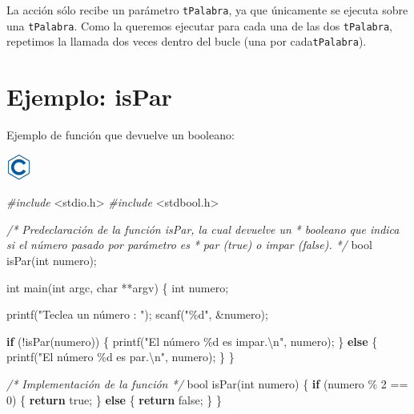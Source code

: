 \documentclass[
]{book}
\newenvironment{Shaded}{\begin{snugshade}}{\end{snugshade}}
\newcommand{\CommentTok}[1]{\textcolor[rgb]{0.56,0.35,0.01}{\textit{#1}}}
\newcommand{\ControlFlowTok}[1]{\textcolor[rgb]{0.13,0.29,0.53}{\textbf{#1}}}
\newcommand{\DataTypeTok}[1]{\textcolor[rgb]{0.13,0.29,0.53}{#1}}
\newcommand{\DecValTok}[1]{\textcolor[rgb]{0.00,0.00,0.81}{#1}}
\newcommand{\ImportTok}[1]{#1}
\newcommand{\NormalTok}[1]{#1}
\newcommand{\PreprocessorTok}[1]{\textcolor[rgb]{0.56,0.35,0.01}{\textit{#1}}}
\newcommand{\SpecialCharTok}[1]{\textcolor[rgb]{0.00,0.00,0.00}{#1}}
\newcommand{\StringTok}[1]{\textcolor[rgb]{0.31,0.60,0.02}{#1}}
\begin{document}
La acción sólo recibe un parámetro \texttt{tPalabra}, ya que únicamente se ejecuta sobre una \texttt{tPalabra}. Como la queremos ejecutar para cada una de las dos \texttt{tPalabra}, repetimos la llamada dos veces dentro del bucle (una por cada\texttt{tPalabra}).

\hypertarget{ejemplo-ispar}{%
\section{Ejemplo: isPar}\label{ejemplo-ispar}}

Ejemplo de función que devuelve un booleano:

\includegraphics{./img/c.png}

\begin{Shaded}
\begin{Highlighting}[]
\PreprocessorTok{\#include }\ImportTok{\textless{}stdio.h\textgreater{}}
\PreprocessorTok{\#include }\ImportTok{\textless{}stdbool.h\textgreater{}}

\CommentTok{/* Predeclaración de la función isPar, la cual devuelve un}
\CommentTok{ * booleano que indica si el número pasado por parámetro es}
\CommentTok{ * par (true) o impar (false).}
\CommentTok{ */}
\DataTypeTok{bool}\NormalTok{ isPar(}\DataTypeTok{int}\NormalTok{ numero);}

\DataTypeTok{int}\NormalTok{ main(}\DataTypeTok{int}\NormalTok{ argc, }\DataTypeTok{char}\NormalTok{ **argv) \{}
    \DataTypeTok{int}\NormalTok{ numero;}
    
\NormalTok{    printf(}\StringTok{"Teclea un número : "}\NormalTok{);}
\NormalTok{    scanf(}\StringTok{"\%d"}\NormalTok{, \&numero);}

    \ControlFlowTok{if}\NormalTok{ (!isPar(numero)) \{}
\NormalTok{        printf(}\StringTok{"El número \%d es impar.}\SpecialCharTok{\textbackslash{}n}\StringTok{"}\NormalTok{, numero);}
\NormalTok{    \} }\ControlFlowTok{else}\NormalTok{ \{}
\NormalTok{        printf(}\StringTok{"El número \%d es par.}\SpecialCharTok{\textbackslash{}n}\StringTok{"}\NormalTok{, numero);}
\NormalTok{    \}}
\NormalTok{\}}

\CommentTok{/* Implementación de la función */}
\DataTypeTok{bool}\NormalTok{ isPar(}\DataTypeTok{int}\NormalTok{ numero) \{}
    \ControlFlowTok{if}\NormalTok{ (numero \% }\DecValTok{2}\NormalTok{ == }\DecValTok{0}\NormalTok{) \{}
        \ControlFlowTok{return}\NormalTok{ true;}
\NormalTok{    \} }\ControlFlowTok{else}\NormalTok{ \{}
        \ControlFlowTok{return}\NormalTok{ false;}
\NormalTok{    \}}
\NormalTok{\}}
\end{Highlighting}
\end{Shaded}
\end{document}
